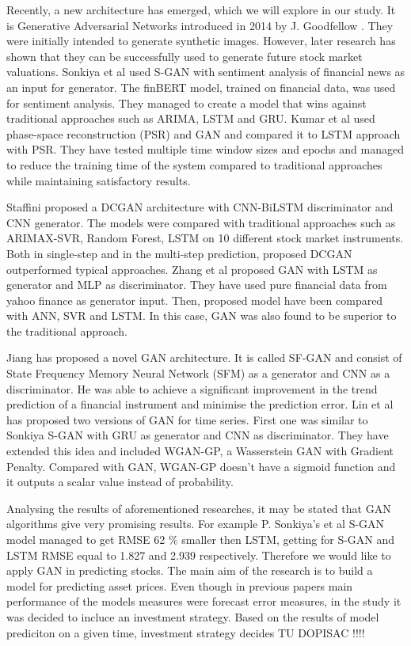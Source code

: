 \documentclass[11pt]{article} %
\begin{document}
Recently, a new architecture has emerged, which we will explore in our study. It is Generative Adversarial Networks introduced in 2014 by J. Goodfellow \cite{gan1}. They were initially intended to generate synthetic images. However, later research has shown that they can be successfully used to generate future stock market valuations. Sonkiya et al \cite{s-gan} used S-GAN with sentiment analysis of financial news as an input for generator. The finBERT model, trained on financial data, was used for sentiment analysis. They managed to create a model that wins against traditional approaches such as ARIMA, LSTM and GRU. Kumar et al  \cite{gan-stock} used phase-space reconstruction (PSR) and GAN and compared it to LSTM approach with PSR. They have tested multiple time window sizes and epochs and managed to reduce the training time of the system compared to traditional approaches while maintaining satisfactory results. 

Staffini \cite{gan-cnn} proposed a DCGAN architecture with CNN-BiLSTM discriminator and CNN generator. The models were compared with traditional approaches such as ARIMAX-SVR, Random Forest, LSTM on 10 different stock market instruments. Both in single-step and in the multi-step prediction, proposed DCGAN outperformed typical approaches. Zhang et al \cite{gan-zhang} proposed GAN with LSTM as generator and MLP as discriminator. They have used pure financial data from yahoo finance as generator input. Then, proposed model have been compared with ANN, SVR and LSTM. In this case, GAN was also found to be superior to the traditional approach.  

Jiang \cite{gan-Jjang} has proposed a novel GAN architecture. It is called SF-GAN and consist of 
State Frequency Memory Neural Network (SFM) as a generator and CNN as a discriminator. 
He was able to achieve a significant improvement in the trend prediction of a financial instrument and minimise the prediction error.  Lin et al \cite{gan-lin} has proposed two versions of GAN for time series. First one was similar to Sonkiya S-GAN with GRU as generator and CNN as discriminator. They have extended this idea and included WGAN-GP, a Wasserstein GAN with Gradient Penalty. Compared with GAN, WGAN-GP doesn't have a sigmoid function and it outputs a scalar value instead of probability. 

Analysing the results of aforementioned researches, it may be stated that GAN algorithms give very promising results. For example P. Sonkiya's et al S-GAN model managed to get RMSE 62 $\% $ smaller then LSTM, getting for S-GAN and LSTM RMSE equal to 1.827 and 2.939 respectively. Therefore we would like to apply GAN in predicting stocks. The main aim of the research is to build a model for predicting asset prices. Even though in previous papers main performance of the models measures were forecast error measures, in the study it was decided to incluce an investment strategy. Based on the results of model prediciton on a given time, investment strategy decides TU DOPISAC !!!!
\end{document}
